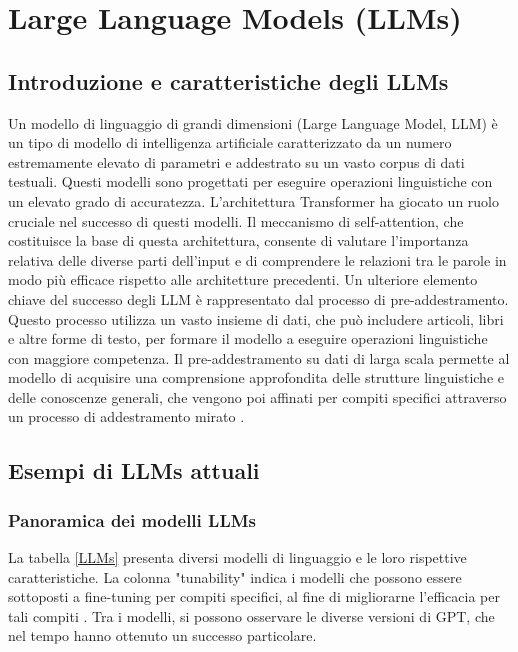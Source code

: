\chapter{Large Language Models (LLMs)}

\section{Introduzione e caratteristiche degli LLMs}
Un modello di linguaggio di grandi dimensioni (Large Language Model, LLM) è un tipo di modello di intelligenza artificiale caratterizzato da un numero estremamente elevato di parametri e addestrato su un vasto corpus di dati testuali. Questi modelli sono progettati per eseguire operazioni linguistiche con un elevato grado di accuratezza.\newline
L'architettura Transformer ha giocato un ruolo cruciale nel successo di questi modelli. Il meccanismo di self-attention, che costituisce la base di questa architettura, consente di valutare l'importanza relativa delle diverse parti dell'input e di comprendere le relazioni tra le parole in modo più efficace rispetto alle architetture precedenti.\newline
Un ulteriore elemento chiave del successo degli LLM è rappresentato dal processo di pre-addestramento. Questo processo utilizza un vasto insieme di dati, che può includere articoli, libri e altre forme di testo, per formare il modello a eseguire operazioni linguistiche con maggiore competenza. Il pre-addestramento su dati di larga scala permette al modello di acquisire una comprensione approfondita delle strutture linguistiche e delle conoscenze generali, che vengono poi affinati per compiti specifici attraverso un processo di addestramento mirato \cite{kasneci2023chatgpt}.

\section{Esempi di LLMs attuali}

\subsection{Panoramica dei modelli LLMs}
La tabella \ref{LLMs} presenta diversi modelli di linguaggio e le loro rispettive caratteristiche. La colonna "tunability" indica i modelli che possono essere sottoposti a fine-tuning per compiti specifici, al fine di migliorarne l'efficacia per tali compiti \cite{yao2024survey}. Tra i modelli, si possono osservare le diverse versioni di GPT, che nel tempo hanno ottenuto un successo particolare.

